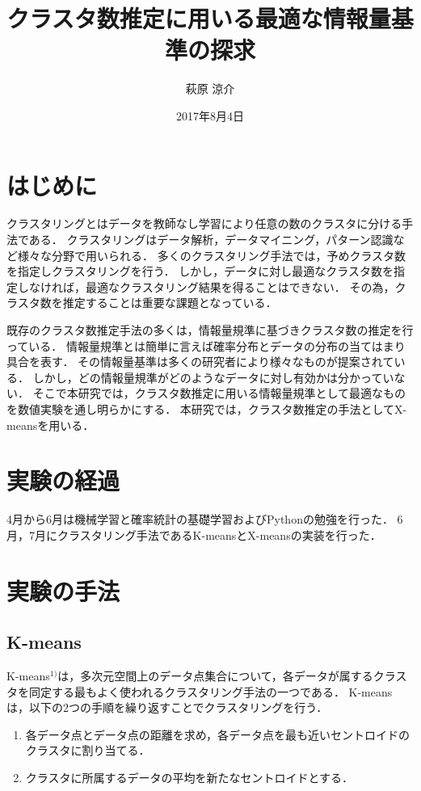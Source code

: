 \documentclass[10pt,a4j,twocolumn]{ltjsarticle}
\author{萩原 涼介}
\title{クラスタ数推定に用いる最適な情報量基準の探求}
\date{2017年8月4日}
\begin{document}
\maketitle
\section{はじめに}
クラスタリングとはデータを教師なし学習により任意の数のクラスタに分ける手法である．
クラスタリングはデータ解析，データマイニング，パターン認識など様々な分野で用いられる．
多くのクラスタリング手法では，予めクラスタ数を指定しクラスタリングを行う．
しかし，データに対し最適なクラスタ数を指定しなければ，最適なクラスタリング結果を得ることはできない．
その為，クラスタ数を推定することは重要な課題となっている．

既存のクラスタ数推定手法の多くは，情報量規準に基づきクラスタ数の推定を行っている．
情報量規準とは簡単に言えば確率分布とデータの分布の当てはまり具合を表す．
その情報量基準は多くの研究者により様々なものが提案されている．
しかし，どの情報量規準がどのようなデータに対し有効かは分かっていない．
そこで本研究では，クラスタ数推定に用いる情報量規準として最適なものを数値実験を通し明らかにする．
本研究では，クラスタ数推定の手法としてX-meansを用いる．

\section{実験の経過}
4月から6月は機械学習と確率統計の基礎学習およびPythonの勉強を行った．
6月，7月にクラスタリング手法であるK-meansとX-meansの実装を行った．

\section{実験の手法}
\subsection{K-means}
K-means$^{1)}$は，多次元空間上のデータ点集合について，各データが属するクラスタを同定する最もよく使われるクラスタリング手法の一つである．
K-meansは，以下の2つの手順を繰り返すことでクラスタリングを行う．
\begin{enumerate}
  \item 各データ点とデータ点の距離を求め，各データ点を最も近いセントロイドのクラスタに割り当てる．
  \item クラスタに所属するデータの平均を新たなセントロイドとする．
\end{enumerate}
\end{document}

